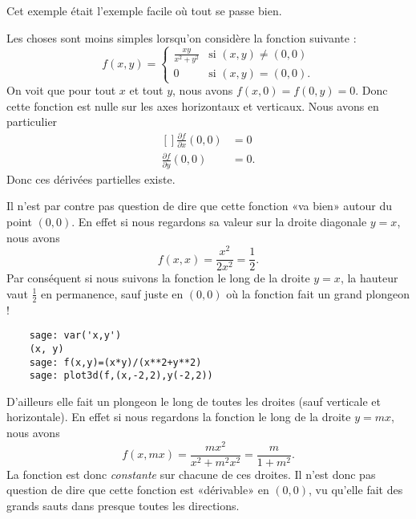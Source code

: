 Cet exemple était l'exemple facile où tout se passe bien.

\begin{example}
    Les choses sont moins simples lorsqu'on considère la fonction suivante :
    \begin{equation}
        f(x,y)=\begin{cases}
            \frac{ xy }{ x^2+y^2 }    &   \text{si }(x,y)\neq(0,0)\\
            0    &    \text{si }(x,y)=(0,0).
        \end{cases}
    \end{equation}
    On voit que pour tout $x$ et tout $y$, nous avons $f(x,0)=f(0,y)=0$. Donc cette fonction est nulle sur les axes horizontaux et verticaux. Nous avons en particulier
    \begin{equation}
        \begin{aligned}[]
            \frac{ \partial f }{ \partial x }(0,0)&=0\\
            \frac{ \partial f }{ \partial y }(0,0)&=0.
        \end{aligned}
    \end{equation}
    Donc ces dérivées partielles existe.

    Il n'est par contre pas question de dire que cette fonction «va bien» autour du point $(0,0)$. En effet si nous regardons sa valeur sur la droite diagonale $y=x$, nous avons
    \begin{equation}
        f(x,x)=\frac{ x^2 }{ 2x^2 }=\frac{ 1 }{2}.
    \end{equation}
    Par conséquent si nous suivons la fonction le long de la droite $y=x$, la hauteur vaut $\frac{ 1 }{2}$ en permanence, sauf juste en $(0,0)$ où la fonction fait un grand plongeon !
    \begin{verbatim}
    sage: var('x,y')
    (x, y)
    sage: f(x,y)=(x*y)/(x**2+y**2)
    sage: plot3d(f,(x,-2,2),y(-2,2))
    \end{verbatim}

    D'ailleurs elle fait un plongeon le long de toutes les droites (sauf verticale et horizontale). En effet si nous regardons la fonction le long de la droite $y=mx$, nous avons
    \begin{equation}
        f(x,mx)=\frac{ mx^2 }{ x^2+m^2x^2 }=\frac{ m }{ 1+m^2 }.
    \end{equation}
    La fonction est donc \emph{constante} sur chacune de ces droites. Il n'est donc pas question de dire que cette fonction est «dérivable» en $(0,0)$, vu qu'elle fait des grands sauts dans presque toutes les directions.
\end{example}


